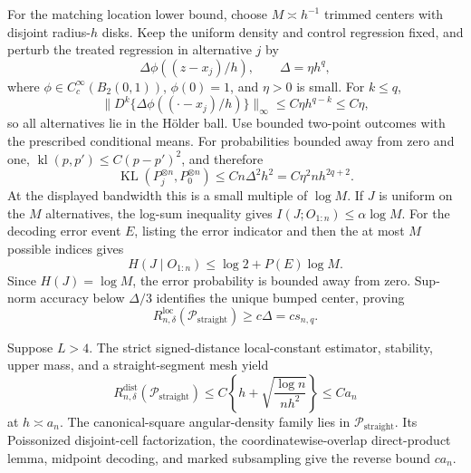 For the matching location lower bound, choose \(M\asymp h^{-1}\) trimmed centers with disjoint radius-\(h\) disks.  Keep the uniform density and control regression fixed, and perturb the treated regression in alternative \(j\) by
\[
 \Delta\phi((z-x_j)/h),
 \qquad \Delta=\eta h^q,
\]
where \(\phi\in C_c^\infty(B_2(0,1))\), \(\phi(0)=1\), and \(\eta>0\) is small.  For \(k\leq q\),
\[
 \lVert D^k\{\Delta\phi((\cdot-x_j)/h)\}\rVert_\infty
 \leq C\eta h^{q-k}\leq C\eta,
\]
so all alternatives lie in the H\"older ball.  Use bounded two-point outcomes with the prescribed conditional means.  For probabilities bounded away from zero and one, \(\operatorname{kl}(p,p')\leq C(p-p')^2\), and therefore
\[
 \operatorname{KL}(P_j^{\otimes n},P_0^{\otimes n})
 \leq Cn\Delta^2h^2=C\eta^2nh^{2q+2}.
\]
At the displayed bandwidth this is a small multiple of \(\log M\).  If \(J\) is uniform on the \(M\) alternatives, the log-sum inequality gives \(I(J;O_{1:n})\leq\alpha\log M\).  For the decoding error event \(E\), listing the error indicator and then the at most \(M\) possible indices gives
\[
 H(J\mid O_{1:n})\leq\log2+P(E)\log M.
\]
Since \(H(J)=\log M\), the error probability is bounded away from zero.  Sup-norm accuracy below \(\Delta/3\) identifies the unique bumped center, proving
\[
 R_{n,\delta}^{\mathrm{loc}}(\mathcal P_{\mathrm{straight}})
 \geq c\Delta=cs_{n,q}.
\]

Suppose \(L>4\).  The strict signed-distance local-constant estimator, stability, upper mass, and a straight-segment mesh yield
\[
 R_{n,\delta}^{\mathrm{dist}}(\mathcal P_{\mathrm{straight}})
 \leq C\left\{h+\sqrt{\frac{\log n}{nh^2}}\right\}\leq Ca_n
\]
at \(h\asymp a_n\).  The canonical-square angular-density family lies in \(\mathcal P_{\mathrm{straight}}\).  Its Poissonized disjoint-cell factorization, the coordinatewise-overlap direct-product lemma, midpoint decoding, and marked subsampling give the reverse bound \(ca_n\).


